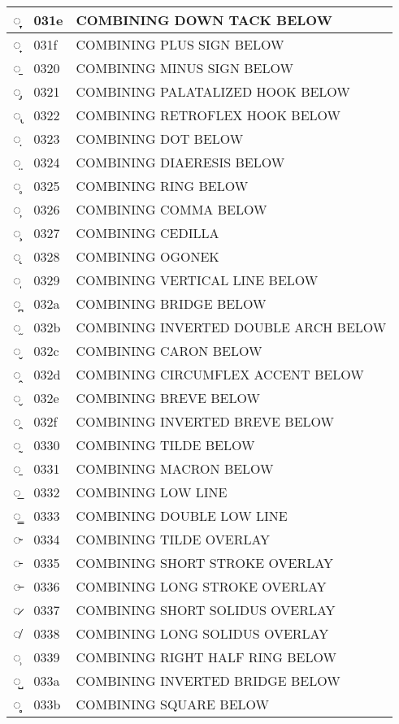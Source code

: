\documentclass[12pt,letterpaper,openany]{book}
\begin{document}
\begin{center}
\begin{supertabular}{|m{0.25in}|m{0.5in}|m{4in}|}
			◌̞ & 031e & COMBINING DOWN TACK BELOW\\\hline
			◌̟ & 031f & COMBINING PLUS SIGN BELOW\\\hline
			◌̠ & 0320 & COMBINING MINUS SIGN BELOW\\\hline
			◌̡ & 0321 & COMBINING PALATALIZED HOOK BELOW\\\hline
			◌̢ & 0322 & COMBINING RETROFLEX HOOK BELOW\\\hline
			◌̣ & 0323 & COMBINING DOT BELOW\\\hline
			◌̤ & 0324 & COMBINING DIAERESIS BELOW\\\hline
			◌̥ & 0325 & COMBINING RING BELOW\\\hline
			◌̦ & 0326 & COMBINING COMMA BELOW\\\hline
			◌̧ & 0327 & COMBINING CEDILLA\\\hline
			◌̨ & 0328 & COMBINING OGONEK\\\hline
			◌̩ & 0329 & COMBINING VERTICAL LINE BELOW\\\hline
			◌̪ & 032a & COMBINING BRIDGE BELOW\\\hline
			◌̫ & 032b & COMBINING INVERTED DOUBLE ARCH BELOW\\\hline
			◌̬ & 032c & COMBINING CARON BELOW\\\hline
			◌̭ & 032d & COMBINING CIRCUMFLEX ACCENT BELOW\\\hline
			◌̮ & 032e & COMBINING BREVE BELOW\\\hline
			◌̯ & 032f & COMBINING INVERTED BREVE BELOW\\\hline
			◌̰ & 0330 & COMBINING TILDE BELOW\\\hline
			◌̱ & 0331 & COMBINING MACRON BELOW\\\hline
			◌̲ & 0332 & COMBINING LOW LINE\\\hline
			◌̳ & 0333 & COMBINING DOUBLE LOW LINE\\\hline
			◌̴ & 0334 & COMBINING TILDE OVERLAY\\\hline
			◌̵ & 0335 & COMBINING SHORT STROKE OVERLAY\\\hline
			◌̶ & 0336 & COMBINING LONG STROKE OVERLAY\\\hline
			◌̷ & 0337 & COMBINING SHORT SOLIDUS OVERLAY\\\hline
			◌̸ & 0338 & COMBINING LONG SOLIDUS OVERLAY\\\hline
			◌̹ & 0339 & COMBINING RIGHT HALF RING BELOW\\\hline
			◌̺ & 033a & COMBINING INVERTED BRIDGE BELOW\\\hline
			◌̻ & 033b & COMBINING SQUARE BELOW\\\hline

\end{supertabular}
\end{center}
\end{document}
